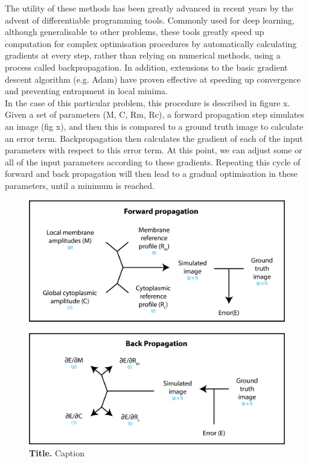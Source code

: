 \documentclass[12pt]{"article"}
\newcommand{\mycaption}[2]{\caption[#1]{\textbf{#1.} #2}}
\begin{document}
The utility of these methods has been greatly advanced in recent years by the advent of differentiable programming tools. Commonly used for deep learning, although generalisable to other problems, these tools greatly speed up computation for complex optimisation procedures by automatically calculating gradients at every step, rather than relying on numerical methods, using a process called backpropagation. In addition, extensions to the basic gradient descent algorithm (e.g. Adam) have proven effective at speeding up convergence and preventing entrapment in local minima. \\

In the case of this particular problem, this procedure is described in figure x. Given a set of parameters (M, C, Rm, Rc), a forward propagation step simulates an image (fig x), and then this is compared to a ground truth image to calculate an error term. Backpropagation then calculates the gradient of each of the input parameters with respect to this error term. At this point, we can adjust some or all of the input parameters according to these gradients. Repeating this cycle of forward and back propagation will then lead to a gradual optimisation in these parameters, until a minimum is reached. \\

\begin{figure}[!h]
\includegraphics[scale=1.1]{memquant_forward_and_back_propagation}
\setlength{\abovecaptionskip}{20pt}
\centering
\mycaption{Title}{Caption}
\label{fig:memquant_forward_and_back_propagation}
\end{figure}
\end{document}
